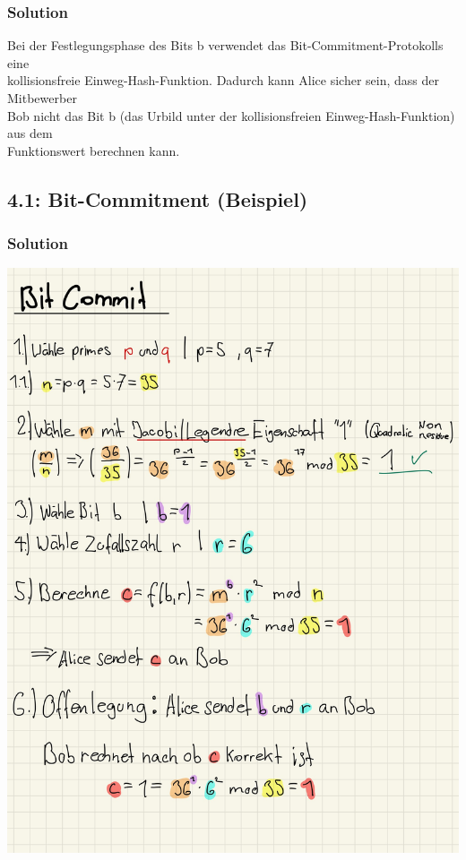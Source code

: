 \documentclass[11pt]{article}
\begin{document}
\hypertarget{solution}{%
\subsubsection{Solution}\label{solution}}

Bei der Festlegungsphase des Bits b verwendet das
Bit-Commitment-Protokolls eine\\
kollisionsfreie Einweg-Hash-Funktion. Dadurch kann Alice sicher sein,
dass der Mitbewerber\\
Bob nicht das Bit b (das Urbild unter der kollisionsfreien
Einweg-Hash-Funktion) aus dem\\
Funktionswert berechnen kann.

    \hypertarget{bit-commitment-beispiel}{%
\subsection{4.1: Bit-Commitment
(Beispiel)}\label{bit-commitment-beispiel}}

\hypertarget{solution}{%
\subsubsection{Solution}\label{solution}}

\begin{center}
	\includegraphics{img/bitcom.jpg}
\end{center}
    
\end{document}
